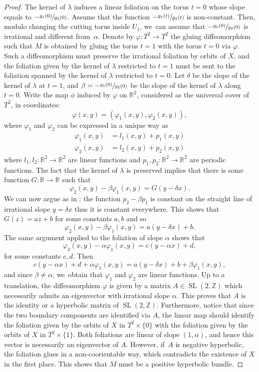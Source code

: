 \documentclass[10pt]{amsart}
\DeclareMathOperator{\SL}{SL}
\theoremstyle{definition}
\begin{document}
\begin{proof}
The kernel of $\lambda$ induces a linear foliation on the torus $t=0$ whose slope equals to $-\sfrac{g_1(0)}{g_2(0)}$. Assume that the function $-\sfrac{g_1(t)}{g_2(t)}$ is non-constant. Then, modulo changing the cutting torus inside $U_1$, we~can assume that $-\sfrac{g_1(0)}{g_2(0)}$ is irrational and different from~$\alpha$. Denote by $\varphi:T^2 \to T^2 $
the gluing diffeomorphism such that $M$ is obtained by gluing the torus $t=1$ with the torus $t=0$ via $\varphi$. Such a diffeomorphism must preserve the irrational foliation by orbits of $X$, and the foliation given by the kernel of $\lambda$ restricted to $t=1$ must be sent to the foliation spanned by the kernel of $\lambda$ restricted to $t=0$. Let $\delta$ be the slope of the kernel of $\lambda$ at $t=1$, and $\beta=-\sfrac{g_1(0)}{g_2(0)}$ be the slope of the kernel of $\lambda$ along $t=0$. Write the map $\phi$ induced by $\varphi$ on $\mathbb{R}^2$, considered as the universal cover of $T^2$, in coordinates:
\[
\varphi(x,y)= (\varphi_1(x,y), \varphi_2(x,y)),
\]
where $\varphi_1$ and $\varphi_2$ can be expressed in a unique way as
\begin{align*}
\varphi_1(x,y)&=l_1(x,y)+p_1(x,y)\\
\varphi_2(x,y)&=l_2(x,y)+p_2(x,y)
\end{align*}
where $l_1,l_2:\mathbb{R}^2\to \mathbb{R}^2$ are linear functions and $p_1,p_2:\mathbb{R}^2\to \mathbb{R}^2$ are periodic functions. The fact that the kernel of $\lambda$ is preserved implies that there is some function $G:\mathbb{R}\to \mathbb{R}$ such that
\[
\varphi_2(x,y)-\beta \varphi_1(x,y)=G(y-\delta x).
\]
We can now argue as in \cite[Lem.\,4.4]{Re}: the function $p_2-\beta p_1$ is constant on the straight line of irrational slope $y=\delta x$ thus it is constant everywhere. This shows that $G(z)=az+b$ for some constants $a,b$ and so
\[
\varphi_2(x,y)-\beta \varphi_1(x,y)=a(y-\delta x)+b.
\]
The same argument applied to the foliation of slope $\alpha$ shows that
\[
\varphi_2(x,y)-\alpha \varphi_1(x,y)=c(y-\alpha x)+d,
\]
for some constants $c,d$. Then
\[
c(y-\alpha x)+d+\alpha \varphi_1(x,y)= a(y-\delta x)+b+\beta \varphi_1(x,y),
\]
and since $\beta\neq \alpha$, we~obtain that $\varphi_1$ and $\varphi_2$ are linear functions. Up to a translation, the diffeomorphism $\varphi$ is given by a matrix $A \in \SL(2,\mathbb{Z})$ which necessarily admits an eigenvector with irrational slope $\alpha$. This proves that $A$ is the identity or a hyperbolic matrix of $\SL(2,\mathbb{Z})$. Furthermore, notice that since the two boundary components are identified via $A$, the linear map should identify the foliation given by the orbits of $X$ in $T^2\times \{0\}$ with the foliation given by the orbits of $X$ in $T^2\times \{1\}$. Both foliations are linear of slope $(1,\alpha)$, and hence this vector is necessarily an eigenvector of $A$. However, if~$A$ is negative hyperbolic, the foliation glues in a non-coorientable way, which contradicts the existence of $X$ in the first place. This shows that $M$ must be a positive hyperbolic bundle.


\end{proof}
\end{document}
